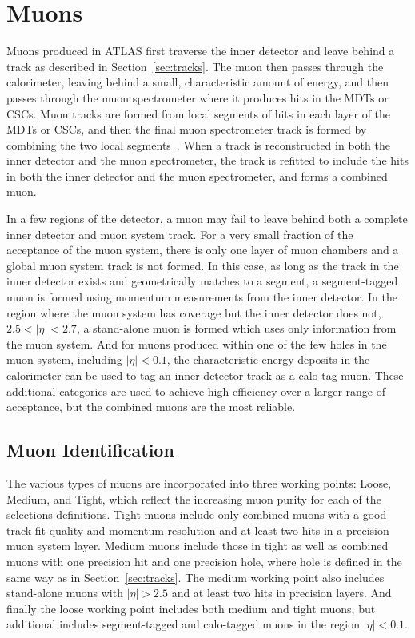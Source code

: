 
\section{Muons}
\label{sec:muons}

Muons produced in \ac{ATLAS} first traverse the inner detector and leave behind a track as described in Section~\ref{sec:tracks}.
The muon then passes through the calorimeter, leaving behind a small, characteristic amount of energy, and then passes through the muon spectrometer where it produces hits in the \acp{MDT} or \acp{CSC}.
Muon tracks are formed from local segments of hits in each layer of the \acp{MDT} or \acp{CSC}, and then the final muon spectrometer track is formed by combining the two local segments~\cite{PERF-2015-10}.
When a track is reconstructed in both the inner detector and the muon spectrometer, the track is refitted to include the hits in both the inner detector and the muon spectrometer, and forms a combined muon.

In a few regions of the detector, a muon may fail to leave behind both a complete inner detector and muon system track.
For a very small fraction of the acceptance of the muon system, there is only one layer of muon chambers and a global muon system track is not formed.
In this case, as long as the track in the inner detector exists and geometrically matches to a segment, a segment-tagged muon is formed using momentum measurements from the inner detector.
In the region where the muon system has coverage but the inner detector does not, $2.5 < |\eta| < 2.7$, a stand-alone muon is formed which uses only information from the muon system.
And for muons produced within one of the few holes in the muon system, including $|\eta| < 0.1$, the characteristic energy deposits in the calorimeter can be used to tag an inner detector track as a calo-tag muon.
These additional categories are used to achieve high efficiency over a larger range of acceptance, but the combined muons are the most reliable.

\subsection{Muon Identification}

The various types of muons are incorporated into three working points: Loose, Medium, and Tight, which reflect the increasing muon purity for each of the selections definitions.
Tight muons include only combined muons with a good track fit quality and momentum resolution and at least two hits in a precision muon system layer.
Medium muons include those in tight as well as combined muons with one precision hit and one precision hole, where hole is defined in the same way as in Section~\ref{sec:tracks}.
The medium working point also includes stand-alone muons with $|\eta| > 2.5$ and at least two hits in precision layers.
And finally the loose working point includes both medium and tight muons, but additional includes segment-tagged and calo-tagged muons in the region $|\eta| < 0.1$.

